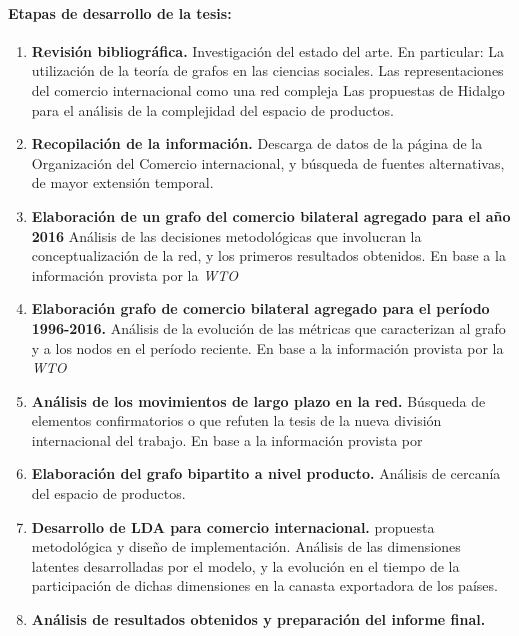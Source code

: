 \documentclass[runningheads,a4paper]{llncs}
\begin{document}
\paragraph{Etapas de desarrollo de la tesis:}
\begin{enumerate}
	\item \textbf{Revisión bibliográfica.} Investigación del estado del arte. En particular:
		\subitem La utilización de la teoría de grafos en las ciencias sociales.
		\subitem Las representaciones del comercio internacional como una red compleja
		\subitem Las propuestas de Hidalgo \citep{Hidalgo2007,Hidalgo2009, Hidalgo2009a} para el análisis de la complejidad del espacio de productos. \\

	\item \textbf{Recopilación de la información.} Descarga de datos de la página de la Organización del Comercio internacional, y búsqueda de fuentes alternativas, de mayor extensión temporal.\\
	
	\item \textbf{Elaboración de un grafo del comercio bilateral agregado para el año 2016} Análisis de las decisiones metodológicas que involucran la conceptualización de la red, y los primeros resultados obtenidos. En base a la información provista por la \textit{WTO}\\

	\item \textbf{Elaboración grafo de comercio bilateral agregado para el período 1996-2016.} Análisis de la evolución de las métricas que caracterizan al grafo y a los nodos en el período reciente. En base a la información provista por la \textit{WTO}\\

	\item \textbf{Análisis de los movimientos de largo plazo en la red.} Búsqueda de elementos confirmatorios o que refuten la tesis de la nueva división internacional del trabajo. En base a la información provista por \citet{Gleditsch2002}\\
	
	\item \textbf{Elaboración del grafo bipartito a nivel producto.} Análisis de cercanía del espacio de productos.\\
	
	\item \textbf{Desarrollo de LDA para comercio internacional.} propuesta metodológica y diseño de implementación. Análisis de las dimensiones latentes desarrolladas por el modelo, y la evolución en el tiempo de la participación de dichas dimensiones en la canasta exportadora de los países. \\
	
	\item \textbf{Análisis de resultados obtenidos y preparación del informe final.} 

\end{enumerate}
\end{document}
